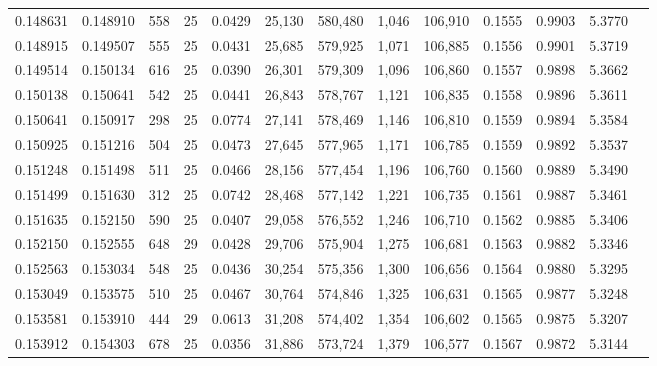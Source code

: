 \begin{tabular}{rrrrrrrrrrrrr}
0.148631 & 0.148910 &   558 &  25 &                                     0.0429 &  25,130 & 580,480 &   1,046 & 106,910 & 0.1555 & 0.9903 & 5.3770 \\
0.148915 & 0.149507 &   555 &  25 &                                     0.0431 &  25,685 & 579,925 &   1,071 & 106,885 & 0.1556 & 0.9901 & 5.3719 \\
0.149514 & 0.150134 &   616 &  25 &                                     0.0390 &  26,301 & 579,309 &   1,096 & 106,860 & 0.1557 & 0.9898 & 5.3662 \\
0.150138 & 0.150641 &   542 &  25 &                                     0.0441 &  26,843 & 578,767 &   1,121 & 106,835 & 0.1558 & 0.9896 & 5.3611 \\
0.150641 & 0.150917 &   298 &  25 &                                     0.0774 &  27,141 & 578,469 &   1,146 & 106,810 & 0.1559 & 0.9894 & 5.3584 \\
0.150925 & 0.151216 &   504 &  25 &                                     0.0473 &  27,645 & 577,965 &   1,171 & 106,785 & 0.1559 & 0.9892 & 5.3537 \\
0.151248 & 0.151498 &   511 &  25 &                                     0.0466 &  28,156 & 577,454 &   1,196 & 106,760 & 0.1560 & 0.9889 & 5.3490 \\
0.151499 & 0.151630 &   312 &  25 &                                     0.0742 &  28,468 & 577,142 &   1,221 & 106,735 & 0.1561 & 0.9887 & 5.3461 \\
0.151635 & 0.152150 &   590 &  25 &                                     0.0407 &  29,058 & 576,552 &   1,246 & 106,710 & 0.1562 & 0.9885 & 5.3406 \\
0.152150 & 0.152555 &   648 &  29 &                                     0.0428 &  29,706 & 575,904 &   1,275 & 106,681 & 0.1563 & 0.9882 & 5.3346 \\
0.152563 & 0.153034 &   548 &  25 &                                     0.0436 &  30,254 & 575,356 &   1,300 & 106,656 & 0.1564 & 0.9880 & 5.3295 \\
0.153049 & 0.153575 &   510 &  25 &                                     0.0467 &  30,764 & 574,846 &   1,325 & 106,631 & 0.1565 & 0.9877 & 5.3248 \\
0.153581 & 0.153910 &   444 &  29 &                                     0.0613 &  31,208 & 574,402 &   1,354 & 106,602 & 0.1565 & 0.9875 & 5.3207 \\
0.153912 & 0.154303 &   678 &  25 &                                     0.0356 &  31,886 & 573,724 &   1,379 & 106,577 & 0.1567 & 0.9872 & 5.3144 \\

\end{tabular}
